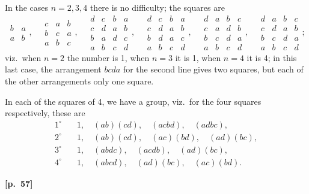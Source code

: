 \documentclass[11pt,a4paper]{article}
\theoremstyle{plain}
\begin{document}
In the cases $n = 2, 3, 4$ there is no difficulty; the squares are
$$
\begin{array}{cc}
b & a \\
a & b
\end{array},
\quad
\begin{array}{ccc}
c & a & b \\
b & c & a \\
a & b & c
\end{array},
\quad
\begin{array}{cccc}
d & c & b & a \\
c & d & a & b \\
b & a & d & c \\
a & b & c & d
\end{array},
\quad
\begin{array}{cccc}
d & c & b & a \\
c & d & a & b \\
b & d & a & c \\
a & b & c & d
\end{array},
\quad
\begin{array}{cccc}
d & a & b & c \\
c & a & d & b \\
b & c & d & a \\
a & b & c & d
\end{array},
\quad
\begin{array}{cccc}
d & a & b & c \\
c & d & a & b \\
b & c & d & a \\
a & b & c & d
\end{array};
$$
viz.\ when $n = 2$ the number is 1, when $n = 3$ it is 1, when $n = 4$ it is 4; in this last case, the arrangement $bcda$ for the second line gives two squares, but each of the other arrangements only one square.

In each of the squares of 4, we have a group, viz.\ for the four squares respectively, these are
\begin{align*}
1^\circ &\quad 1, \quad (ab)(cd), \quad (acbd), \quad (adbc), \\
2^\circ &\quad 1, \quad (ab)(cd), \quad (ac)(bd), \quad (ad)(bc), \\
3^\circ &\quad 1, \quad (abdc), \quad (acdb), \quad (ad)(bc), \\
4^\circ &\quad 1, \quad (abcd), \quad (ad)(bc), \quad (ac)(bd).
\end{align*}

\vspace{0.5em}
\noindent\textbf{[p.\ 57]}
\end{document}
